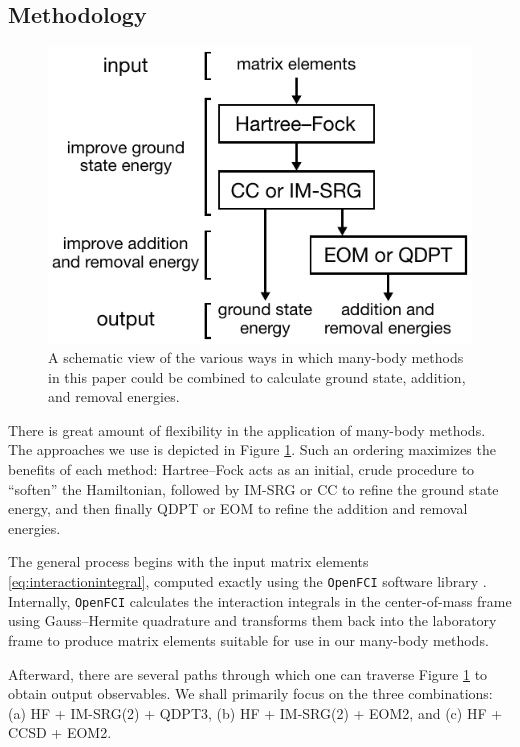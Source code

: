 \subsection{Methodology}
\label{subsec:methodology}

\begin{figure}
  \centering
  \includegraphics{figures/fig-methods}
  \caption{A schematic view of the various ways in which many-body methods in this paper could be combined to calculate ground state, addition, and removal energies.}
  \label{fig:methods}
\end{figure}

There is great amount of flexibility in the application of many-body methods.  The approaches we use is depicted in Figure \ref{fig:methods}.  Such an ordering maximizes the benefits of each method: Hartree--Fock acts as an initial, crude procedure to ``soften'' the Hamiltonian, followed by IM-SRG or CC to refine the ground state energy, and then finally QDPT or EOM to refine the addition and removal energies.

The general process begins with the input matrix elements \eqref{eq:interactionintegral}, computed exactly using the \texttt{OpenFCI} software library \cite{2008arXiv0810.2644K}.  Internally, \texttt{OpenFCI} calculates the interaction integrals in the center-of-mass frame using Gauss--Hermite quadrature and transforms them back into the laboratory frame to produce matrix elements suitable for use in our many-body methods.

Afterward, there are several paths through which one can traverse Figure \ref{fig:methods} to obtain output observables.  We shall primarily focus on the three combinations: (a) HF + IM-SRG(2) + QDPT3, (b) HF + IM-SRG(2) + EOM2, and (c) HF + CCSD + EOM2.

